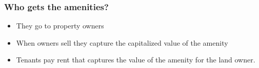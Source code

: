 \documentclass[notes]{beamer}
\begin{document}
\begin{frame}\frametitle{Who gets the amenities?}
\begin{itemize}
\item They go to property owners 

\item When owners sell they capture the capitalized  value of the amenity

\item Tenants pay rent that captures the value of the amenity for the land owner. 


\end{itemize}



\end{frame}
\end{document}

